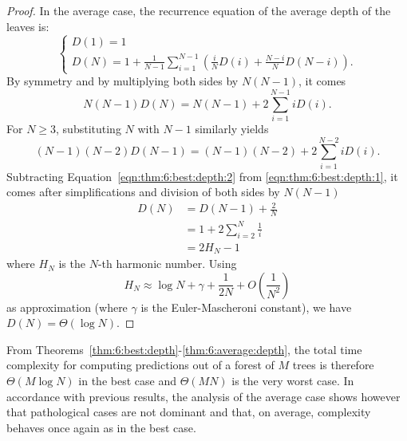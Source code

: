 \begin{proof}
In the average case, the recurrence equation of the average depth of the leaves is:
\begin{equation}
\begin{cases}
D(1) = 1 \\
D(N) = 1 + \frac{1}{N-1} \sum_{i=1}^{N-1} (\frac{i}{N} D(i) + \frac{N-i}{N} D(N-i)).
\end{cases}
\end{equation}
By symmetry and by multiplying both sides by $N(N-1)$, it comes
\begin{equation}\label{eqn:thm:6:best:depth:1}
N(N-1) D(N) = N(N-1) + 2 \sum_{i=1}^{N-1} i D(i).
\end{equation}
For $N\geq3$, substituting $N$ with $N-1$ similarly yields
\begin{equation}\label{eqn:thm:6:best:depth:2}
(N-1)(N-2) D(N-1) = (N-1)(N-2) + 2 \sum_{i=1}^{N-2} i D(i).
\end{equation}
Subtracting Equation~\ref{eqn:thm:6:best:depth:2} from \ref{eqn:thm:6:best:depth:1},
it comes after simplifications and division of both sides by $N(N-1)$
\begin{align}
D(N) &= D(N-1) + \frac{2}{N} \nonumber \\
    &= 1 + 2 \sum_{i=2}^N \frac{1}{i} \nonumber \\
    &= 2H_N - 1
\end{align}
where $H_N$ is the $N$-th harmonic number. Using
\begin{equation}
H_N \approx \log N + \gamma + \frac{1}{2N} + O(\frac{1}{N^2})
\end{equation}
as approximation (where $\gamma$ is the Euler-Mascheroni constant), we have $D(N) = \Theta(\log N)$.
\end{proof}

From Theorems~\ref{thm:6:best:depth}-\ref{thm:6:average:depth}, the total time
complexity for computing predictions out of a forest of $M$ trees is therefore
$\Theta(M\log N)$ in the best case and $\Theta(MN)$ is the very worst case. In accordance
with previous results, the analysis of the average case shows however that
pathological cases are not dominant and that, on average, complexity behaves
once again as in the best case.

